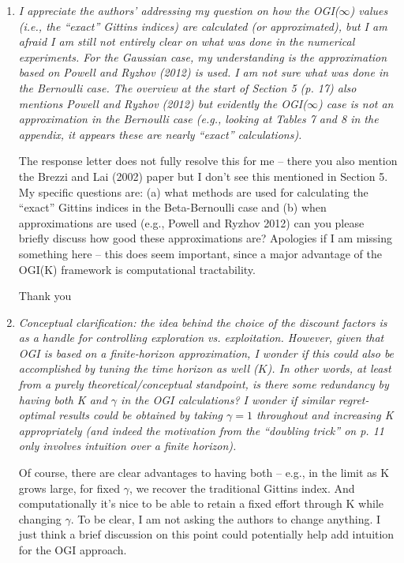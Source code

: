 \documentclass[11pt]{article}
\newcommand{\1}{\ensuremath{\mathbf{1}}} %
\theoremstyle{thm-sf}
\begin{document}
	
	\begin{enumerate}
		
		\item {\it I appreciate the authors’ addressing my question on how the OGI($\infty$) values (i.e., the “exact” Gittins indices) are calculated (or approximated), but I am afraid I am still not entirely clear on what was done in the numerical experiments. For the Gaussian case, my understanding is the approximation based on Powell and Ryzhov (2012) is used. I am not sure what was done in the Bernoulli case. The overview at the start of Section 5 (p. 17) also mentions Powell and Ryzhov (2012) but evidently the OGI($\infty$) case is not an approximation in the Bernoulli case (e.g., looking at Tables 7 and 8 in the appendix, it appears these are nearly “exact” calculations).
			
		The response letter does not fully resolve this for me – there you also mention the Brezzi and Lai (2002) paper but I don’t see this mentioned in Section 5. My specific questions are: (a) what methods are used for calculating the “exact” Gittins indices in the Beta-Bernoulli case and (b) when approximations are used (e.g., Powell and Ryzhov 2012) can you please briefly discuss how good these approximations are?
		Apologies if I am missing something here – this does seem important, since a major advantage of the OGI(K) framework is computational tractability.
		}

Thank you
		
		
		\item {\it Conceptual clarification: the idea behind the choice of the discount factors is as a handle for controlling exploration vs. exploitation. However, given that OGI is based on a finite-horizon approximation, I wonder if this could also be accomplished by tuning the time horizon as well ($K$). In other words, at least from a purely theoretical/conceptual standpoint, is there some redundancy by having both K and $\gamma$ in the OGI calculations? I wonder if similar regret-optimal results could be obtained by taking $\gamma=1$ throughout and increasing K appropriately (and indeed the motivation from the “doubling trick” on p. 11 only involves intuition over a finite horizon).
	   
	   Of course, there are clear advantages to having both – e.g., in the limit as K grows large, for fixed $\gamma$, we recover the traditional Gittins index. And computationally it’s nice to be able to retain a fixed effort through K while changing $\gamma$.
	   To be clear, I am not asking the authors to change anything. I just think a brief discussion on this point could potentially help add intuition for the OGI approach.	
	}


\end{enumerate}
\end{document}
